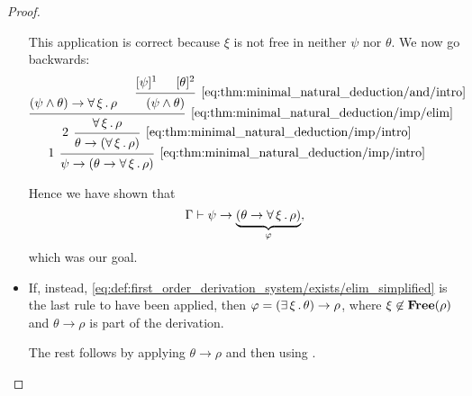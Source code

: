 \begin{proof}
\begin{itemize}
    This application is correct because \( \xi \) is not free in neither \( \psi \) nor \( \theta \). We now go backwards:
    \begin{equation*}
      \begin{prooftree}
        \hypo{ (\psi \wedge \theta) \rightarrow \qforall \xi \rho }

        \hypo{ [\psi]^1 }
        \hypo{ [\theta]^2 }
        \infer2[\eqref{eq:thm:minimal_natural_deduction/and/intro}]{ (\psi \wedge \theta) }
        \infer2[\eqref{eq:thm:minimal_natural_deduction/imp/elim}]{ \qforall \xi \rho }
        \infer[left label=\( 2 \)]1[\eqref{eq:thm:minimal_natural_deduction/imp/intro}]{ \theta \rightarrow (\qforall \xi \rho) }
        \infer[left label=\( 1 \)]1[\eqref{eq:thm:minimal_natural_deduction/imp/intro}]{ \psi \rightarrow (\theta \rightarrow \qforall \xi \rho) }
      \end{prooftree}
    \end{equation*}

    Hence we have shown that
    \begin{equation*}
      \Gamma \vdash \psi \rightarrow \underbrace{(\theta \rightarrow \forall \thinspace \xi \thinspace . \thinspace \rho)}_{\varphi},
    \end{equation*}
    which was our goal.

    \item If, instead, \eqref{eq:def:first_order_derivation_system/exists/elim_simplified} is the last rule to have been applied, then \( \varphi = (\exists \thinspace \xi \thinspace . \thinspace \theta) \rightarrow \rho \), where \( \xi \not\in \operatorname{\mathbf{Free}}(\rho) \) and \( \theta \rightarrow \rho \) is part of the derivation.

    The rest follows by applying  \( \theta \rightarrow \rho \) and then using .
  \end{itemize}
\end{proof}
